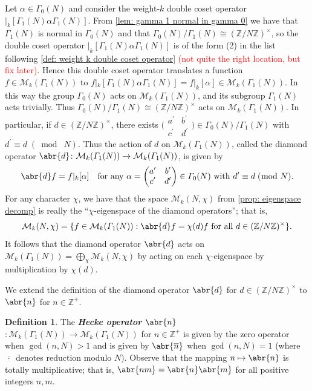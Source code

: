 \documentclass[10pt,leqno,twoside]{article}
\theoremstyle{plain}
\theoremstyle{definition}
\newtheorem{definition/}[lem]{Definition}
\newenvironment{definition}
  {\renewcommand{\qedsymbol}{\textdagger}%
   \pushQED{\qed}\begin{definition/}}
  {\popQED\end{definition/}}
\numberwithin{equation}{section}
\numberwithin{lem}{section}
\newcommand{\textib}[1]{\textbf{\textit{#1\index{#1}}}} %
\newcommand{\smod}[1]{\;(\bmod\; #1)}
\newcommand{\sai}[1]{\textcolor{red}{#1}}
\begin{document}
Let $\alpha\in\varGamma_0(N)$ and consider the weight-$k$ double coset operator $|_k[\varGamma_1(N)\alpha\varGamma_1(N)]$. From \cref{lem: gamma 1 normal in gamma 0} we have that $\varGamma_1(N)$ is normal in $\varGamma_0(N)$ and that $\varGamma_0(N)/\varGamma_1(N)\cong (\mathbb Z/N\mathbb Z)^\times$, so the double coset operator $|_k[\varGamma_1(N)\alpha\varGamma_1(N)]$ is of the form (2) in the list following \cref{def: weight k double coset operator} \sai{(not quite the right location, but fix later)}. Hence this double coset operator translates a function $f\in \mathcal M_k(\varGamma_1(N))$ to $f|_k[\varGamma_1(N)\alpha\varGamma_1(N)] = f|_k[\alpha]\in \mathcal M_k(\varGamma_1(N))$. In this way the group $\varGamma_0(N)$ acts on $\mathcal M_k(\varGamma_1(N))$, and its subgroup $\varGamma_1(N)$ acts trivially. Thus $\varGamma_0(N)/\varGamma_1(N)\cong (\mathbb Z/N\mathbb Z)^\times$ acts on $\mathcal M_k(\varGamma_1(N))$. In particular, if $d\in (\mathbb Z/N\mathbb Z)^\times$, there exists $\big(\!\begin{smallmatrix}
    a^\prime & b^\prime \\ c^\prime & d^\prime
\end{smallmatrix}\!\big)\in \varGamma_0(N)/\varGamma_1(N)$ with $d^\prime\equiv d\smod N$. Thus the action of $d$ on $\mathcal M_k(\varGamma_1(N))$, called the diamond operator $\abr{d}\colon \mathcal M_k(\varGamma_1(N))\to \mathcal M_k(\varGamma_1(N))$, is given by 
\[\abr{d}f = f|_k[\alpha] \quad \text{for any $\alpha = \begin{pmatrix}
    a^\prime & b^\prime \\ c^\prime & d^\prime
\end{pmatrix}\in \varGamma_0(N)$ with $d^\prime\equiv d\smod N$}.\]
For any character $\chi$, we have that the space $\mathcal M_k(N,\chi)$ from \cref{prop: eigenspace decomp} is really the ``$\chi$-eigenspace of the diamond operators''; that is,
\[\mathcal M_k(N,\chi) = \{f\in \mathcal M_k(\varGamma_1(N)) : \abr{d}f = \chi(d)f \text{ for all } d\in(\mathbb Z/N\mathbb Z)^\times\}.\] 
It follows that the diamond operator $\abr{d}$ acts on $\mathcal M_k(\varGamma_1(N)) = \bigoplus_\chi\mathcal M_k(N,\chi)$ by acting on each $\chi$-eigenspace by multiplication by $\chi(d)$.

We extend the definition of the diamond operator $\abr{d}$ for $d\in (\mathbb Z/N\mathbb Z)^\times$ to $\abr{n}$ for $n\in\mathbb{Z}^+$.
\begin{definition}
    The \textib{Hecke operator $\abr{n}$}$\colon \mathcal M_k(\varGamma_1(N))\to \mathcal M_k(\varGamma_1(N))$ for $n\in\mathbb{Z}^+$ is given by the zero operator when $\gcd(n,N)>1$ and is given by $\abr{\overline n}$ when $\gcd(n,N) = 1$ (where $\overline{\,\cdot\,}$ denotes reduction modulo $N$). Observe that the mapping $n\mapsto \abr{n}$ is totally multiplicative; that is, $\abr{nm} = \abr{n}\abr{m}$ for all positive integers $n,m$.
\end{definition}
\end{document}
